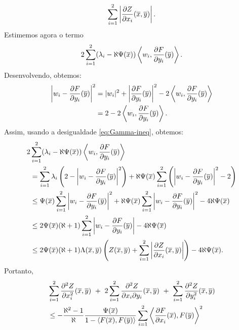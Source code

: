 \begin{demonstracao}
\begin{equation*}
\begin{aligned}
\sum_{i=1}^2\left|\frac{\partial Z}{\partial x_i}(\overline{x},\overline{y})\right|.
\end{aligned}
\end{equation*}
Estimemos agora o termo
\[
2\sum_{i=1}^2(\lambda_i-\aleph\Psi(\overline{x}))\left\langle w_i,
\frac{\partial F}{\partial y_i}(\overline{y})\right\rangle.
\]
Desenvolvendo, obtemos:
\begin{equation*}
\begin{aligned}
\left| w_i-\frac{\partial F}{\partial y_i}(\overline{y})\right|^2 &=
|w_i|^2 + \left|\frac{\partial F}{\partial y_i}(\overline{y})\right|^2 -
2\left\langle w_i,\frac{\partial F}{\partial y_i}(\overline{y})\right\rangle \\
&=
2 - 2\left\langle w_i,\frac{\partial F}{\partial y_i}(\overline{y})\right\rangle.
\end{aligned}
\end{equation*}
Assim, usando a desigualdade \eqref{eq:Gamma-ineq}, obtemos:
\begin{equation*}
\begin{aligned}
2&\sum_{i=1}^2(\lambda_i-\aleph\Psi(\overline{x}))\left\langle w_i,
\frac{\partial F}{\partial y_i}(\overline{y})\right\rangle \\
&=
\sum_{i=1}^2\lambda_i\left(2-\left| w_i-\frac{\partial F}{\partial y_i}(\overline{y})
\right|^2\right) +
\aleph\Psi(\overline{x})\sum_{i=1}^2\left(
\left| w_i-\frac{\partial F}{\partial y_i}(\overline{y})\right|^2-2\right) \\
&\leq 
\Psi(\overline{x})\sum_{i=1}^2\left| w_i-\frac{\partial F}{\partial y_i}(\overline{y})\right|^2 +
\aleph\Psi(\overline{x})\sum_{i=1}^2
\left| w_i-\frac{\partial F}{\partial y_i}(\overline{y})\right|^2 
-4\aleph\Psi(\overline{x}) \\
&\leq
2\Psi(\overline{x})(\aleph+1)\sum_{i=1}^2
\left| w_i-\frac{\partial F}{\partial y_i}(\overline{y})\right| -4\aleph\Psi(\overline{x}) \\
& \leq
2\Psi(\overline{x})(\aleph+1)\Lambda(\overline{x},\overline{y})\left(Z(\overline{x},\overline{y})
+\sum_{i=1}^2\left|\frac{\partial Z}{\partial x_i}(\overline{x},\overline{y})\right|\right)
-4\aleph\Psi(\overline{x}).
\end{aligned}
\end{equation*}
Portanto,
\begin{equation*}
\begin{aligned}
&\sum_{i=1}^2\frac{\partial^2 Z}{\partial x_i^2}(\xb,\yb) \ + \ 
2 \sum_{i=1}^2 \frac{\partial^2 Z}{\partial x_i \partial y_i}(\xb,\yb) \ + \ 
\sum_{i=1}^2 \frac{\partial^2 Z}{\partial y_i^2}(\xb,\yb)  \\
& \leq
- \frac{\aleph^2 - 1}{\aleph} \frac{\Psi(\xb)}{1 - \langle F(\xb), F(\yb) \rangle} \sum_{i=1}^2 \left\langle \frac{\partial F}{\partial x_i}(\xb), F(\yb) \right\rangle^2 \\

\end{aligned}
\end{equation*}
\end{demonstracao}
